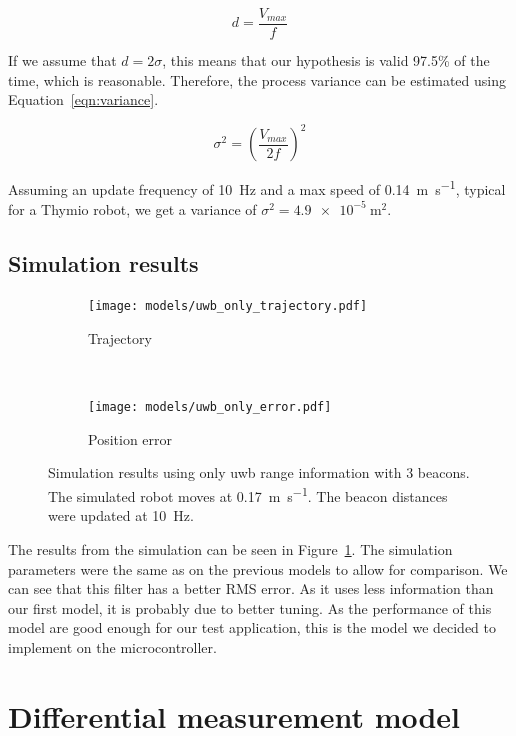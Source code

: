\documentclass[a4paper, 12pt]{scrreprt}
\begin{document}
\begin{equation}
d = \frac{V_{max}}{f}
\label{eqn:travelled-distance}
\end{equation}

If we assume that \(d = 2 \sigma\), this means that our hypothesis is valid 97.5\% of the time, which is reasonable.
Therefore, the process variance can be estimated using Equation~\ref{eqn:variance}.

\begin{equation}
\sigma^2 = \left( \frac{V_{max}}{2 f} \right)^2
\label{eqn:variance}
\end{equation}

Assuming an update frequency of \SI{10}{\hertz} and a max speed of \SI{0.14}{\meter\per\second}, typical for a Thymio robot\cite{thymioweb}, we get a variance of $\sigma^2 = \SI{4.9e-5}{\meter\squared}$.


\subsection{Simulation results}

\begin{figure}[htpb]
    \centering
    \begin{subfigure}[t]{0.4\textwidth}
        \texttt{[image: models/uwb\_only\_trajectory.pdf]}
        \caption{Trajectory}
    \end{subfigure}%
    ~
    \begin{subfigure}[t]{0.4\textwidth}
        \texttt{[image: models/uwb\_only\_error.pdf]}
        \caption{Position error}
    \end{subfigure}
    \caption{
        Simulation results using only \gls{uwb} range information with 3 beacons.
        The simulated robot moves at \SI{0.17}{\meter\per\second}.
        The beacon distances were updated at \SI{10}{\hertz}.
        \label{fig:uwb_only}
    }
\end{figure}

The results from the simulation can be seen in Figure~\ref{fig:uwb_only}.
The simulation parameters were the same as on the previous models to allow for comparison.
We can see that this filter has a better RMS error.
As it uses less information than our first model, it is probably due to better tuning.
As the performance of this model are good enough for our test application, this is the model we decided to implement on the microcontroller.

\section{Differential measurement model}
\end{document}
